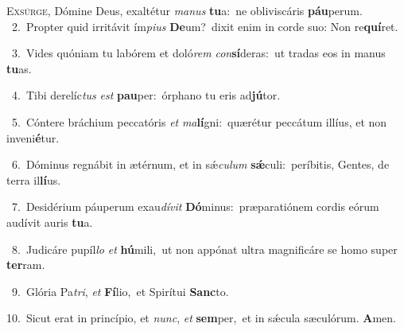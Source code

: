 \lettrine{\initial\textcolor{\initialcolor}{E}}{xsúrge,} Dómine Deus, exaltétur \textit{ma}\-\textit{nus} \textbf{tu}\-a:~\star ne obliviscáris \textbf{páu}\-perum.\\
{\numbfont\textcolor{\numbcolor}{~2.}}~Propter quid irritávit ím\-\textit{pi}\-\textit{us} \textbf{De}\-um?~\star dixit enim in corde suo: Non re\-\textbf{quí}\-ret.\par
{\numbfont\textcolor{\numbcolor}{~3.}}~Vides quóniam tu labórem et doló\textit{rem} \textit{con}\-\textbf{sí}deras:~\star ut tradas eos in manus \textbf{tu}\-as.\par
{\numbfont\textcolor{\numbcolor}{~4.}}~Tibi derelíc\textit{tus} \textit{est} \textbf{pau}\-per:~\star órphano tu eris ad\-\textbf{jú}\-tor.\par
{\numbfont\textcolor{\numbcolor}{~5.}}~Cóntere bráchium peccatóris \textit{et} \textit{ma}\-\textbf{lí}gni:~\star quærétur peccátum illíus, et non inveni\-\textbf{é}\-tur.\par
{\numbfont\textcolor{\numbcolor}{~6.}}~Dóminus regnábit in ætérnum, et in sǽ\-\textit{cu}\-\textit{lum} \textbf{sǽ}\-culi:~\star períbitis, Gentes, de terra il\-\textbf{lí}\-us.\par
{\numbfont\textcolor{\numbcolor}{~7.}}~Desidérium páuperum exau\-\textit{dí}\-\textit{vit} \textbf{Dó}\-minus:~\star præparatiónem cordis eórum audívit auris \textbf{tu}\-a.\par
{\numbfont\textcolor{\numbcolor}{~8.}}~Judicáre pupíl\textit{lo} \textit{et} \textbf{hú}\-mili,~\star ut non appónat ultra magnificáre se homo super \textbf{ter}\-ram.\par
{\numbfont\textcolor{\numbcolor}{~9.}}~Glória Pa\-\textit{tri}\-, \textit{et} \textbf{Fí}\-lio,~\star et Spirítui \textbf{Sanc}\-to.\par
{\numbfont\textcolor{\numbcolor}{10.}}~Sicut erat in princípio, et \textit{nunc}\-, \textit{et} \textbf{sem}\-per,~\star et in sǽcula sæculórum. \textbf{A}\-men.\par
